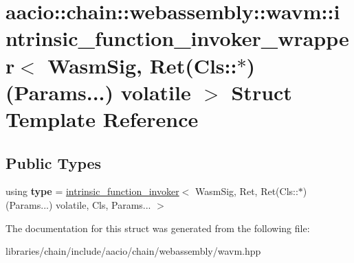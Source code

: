 \hypertarget{structaacio_1_1chain_1_1webassembly_1_1wavm_1_1intrinsic__function__invoker__wrapper_3_01_wasm_s07e61c33adfedee6c122dcc742235f31}{}\section{aacio\+:\+:chain\+:\+:webassembly\+:\+:wavm\+:\+:intrinsic\+\_\+function\+\_\+invoker\+\_\+wrapper$<$ Wasm\+Sig, Ret(Cls\+:\+:$\ast$)(Params...) volatile $>$ Struct Template Reference}
\label{structaacio_1_1chain_1_1webassembly_1_1wavm_1_1intrinsic__function__invoker__wrapper_3_01_wasm_s07e61c33adfedee6c122dcc742235f31}
\subsection*{Public Types}
\begin{DoxyCompactItemize}
\item 
\mbox{\label{structaacio_1_1chain_1_1webassembly_1_1wavm_1_1intrinsic__function__invoker__wrapper_3_01_wasm_s07e61c33adfedee6c122dcc742235f31_a08d78a6c84c378c8e9512fd0627aa310}} 
using {\bfseries type} = \mbox{\hyperlink{structaacio_1_1chain_1_1webassembly_1_1wavm_1_1intrinsic__function__invoker}{intrinsic\+\_\+function\+\_\+invoker}}$<$ Wasm\+Sig, Ret, Ret(Cls\+::$\ast$)(Params...) volatile, Cls, Params... $>$
\end{DoxyCompactItemize}


The documentation for this struct was generated from the following file\+:\begin{DoxyCompactItemize}
\item 
libraries/chain/include/aacio/chain/webassembly/wavm.\+hpp\end{DoxyCompactItemize}

